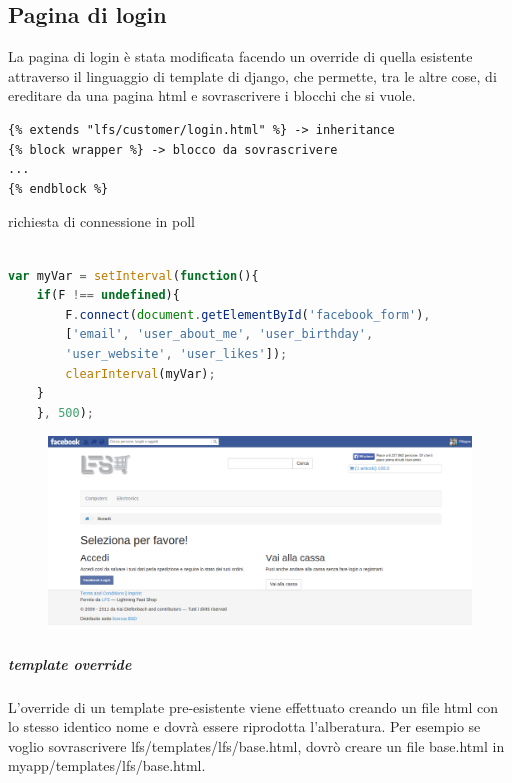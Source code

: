 \subsection{Pagina di login}
La pagina di login è stata modificata facendo un override di quella esistente attraverso il linguaggio di template di django, che permette, tra le altre cose, di ereditare da una pagina html e sovrascrivere i blocchi che si vuole.

\begin{shaded}
\begin{lstlisting}[language=html]
{% extends "lfs/customer/login.html" %} -> inheritance
{% block wrapper %} -> blocco da sovrascrivere
...
{% endblock %}
\end{lstlisting}
\end{shaded}

richiesta di connessione in poll 

\begin{shaded}
\begin{lstlisting}[language=JavaScript]

var myVar = setInterval(function(){
    if(F !== undefined){
        F.connect(document.getElementById('facebook_form'), 
        ['email', 'user_about_me', 'user_birthday', 
        'user_website', 'user_likes']);
        clearInterval(myVar);
    }
    }, 500);

\end{lstlisting}
\end{shaded}

\begin{figure}
\includegraphics[width=0.9\columnwidth]{img/checkout}
\end{figure}

\subparagraph{template override}
L'override di un template pre-esistente viene effettuato creando un file html con lo stesso identico nome e dovrà essere riprodotta l'alberatura. Per esempio se voglio sovrascrivere lfs/templates/lfs/base.html, dovrò creare un file base.html in myapp/templates/lfs/base.html. 

